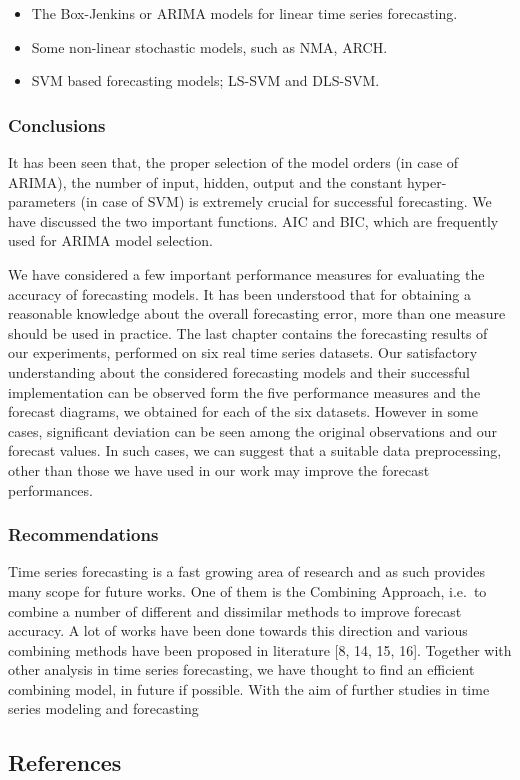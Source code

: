 \documentclass[
  letterpaper,
  DIV=11,
  numbers=noendperiod]{scrartcl}
\providecommand{\tightlist}{%
  \setlength{\itemsep}{0pt}\setlength{\parskip}{0pt}}\usepackage{longtable,booktabs,array}
\begin{document}
\begin{itemize}
\tightlist
\item
  The Box-Jenkins or ARIMA models for linear time series forecasting.
\item
  Some non-linear stochastic models, such as NMA, ARCH.
\item
  SVM based forecasting models; LS-SVM and DLS-SVM.
\end{itemize}

\hypertarget{conclusions}{%
\subsubsection{Conclusions}\label{conclusions}}

It has been seen that, the proper selection of the model orders (in case
of ARIMA), the number of input, hidden, output and the constant
hyper-parameters (in case of SVM) is extremely crucial for successful
forecasting. We have discussed the two important functions. AIC and BIC,
which are frequently used for ARIMA model selection.

We have considered a few important performance measures for evaluating
the accuracy of forecasting models. It has been understood that for
obtaining a reasonable knowledge about the overall forecasting error,
more than one measure should be used in practice. The last chapter
contains the forecasting results of our experiments, performed on six
real time series datasets. Our satisfactory understanding about the
considered forecasting models and their successful implementation can be
observed form the five performance measures and the forecast diagrams,
we obtained for each of the six datasets. However in some cases,
significant deviation can be seen among the original observations and
our forecast values. In such cases, we can suggest that a suitable data
preprocessing, other than those we have used in our work may improve the
forecast performances.

\hypertarget{recommendations}{%
\subsubsection{Recommendations}\label{recommendations}}

Time series forecasting is a fast growing area of research and as such
provides many scope for future works. One of them is the Combining
Approach, i.e.~to combine a number of different and dissimilar methods
to improve forecast accuracy. A lot of works have been done towards this
direction and various combining methods have been proposed in literature
{[}8, 14, 15, 16{]}. Together with other analysis in time series
forecasting, we have thought to find an efficient combining model, in
future if possible. With the aim of further studies in time series
modeling and forecasting

\hypertarget{references}{%
\subsection{References}\label{references}}


\printbibliography
\end{document}

